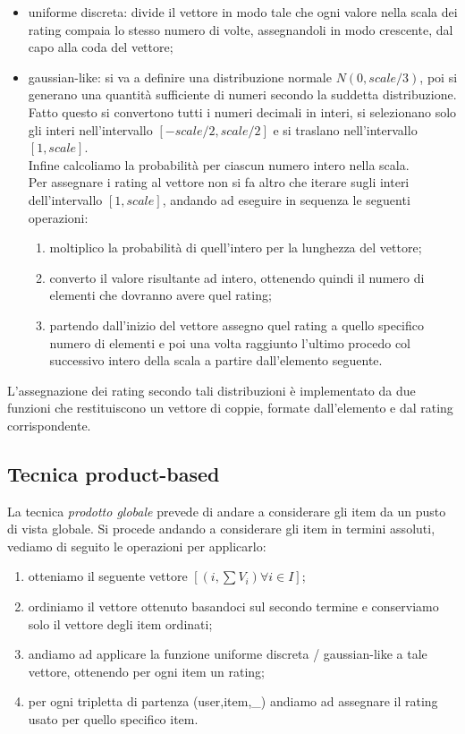 \begin{itemize}
    \item uniforme discreta: divide il vettore in modo tale che ogni valore nella scala dei rating compaia lo stesso numero di volte, assegnandoli in modo crescente, dal capo alla coda del vettore;
    \item gaussian-like: si va a definire una distribuzione normale $N(0,scale/3)$, poi si generano una quantità sufficiente di numeri secondo la suddetta distribuzione. Fatto questo si convertono tutti i numeri decimali in interi, si selezionano solo gli interi nell'intervallo $[-scale/2,scale/2]$ e si traslano nell'intervallo $[1,scale]$.\\
    Infine calcoliamo la probabilità per ciascun numero intero nella scala.\\
    Per assegnare i rating al vettore non si fa altro che iterare sugli interi dell'intervallo $[1,scale]$, andando ad eseguire in sequenza le seguenti operazioni:
    \begin{enumerate}
        \item moltiplico la probabilità di quell'intero per la lunghezza del vettore;
        \item converto il valore risultante ad intero, ottenendo quindi il numero di elementi che dovranno avere quel rating;
        \item partendo dall'inizio del vettore assegno quel rating a quello specifico numero di elementi e poi una volta raggiunto l'ultimo procedo col successivo intero della scala a partire dall'elemento seguente.
    \end{enumerate}
\end{itemize}
L'assegnazione dei rating secondo tali distribuzioni è implementato da due funzioni che restituiscono un vettore di coppie, formate dall'elemento e dal rating corrispondente.

\subsection{Tecnica product-based}
La tecnica \textit{prodotto globale} prevede di andare a considerare gli item da un pusto di vista globale. Si procede andando a considerare gli item in termini assoluti, vediamo di seguito le operazioni per applicarlo:
\begin{enumerate}
    \item otteniamo il seguente vettore $[(i,\sum V_i) \forall i \in I]$;
    \item ordiniamo il vettore ottenuto basandoci sul secondo termine e conserviamo solo il vettore degli item ordinati;
    \item andiamo ad applicare la funzione uniforme discreta / gaussian-like a tale vettore, ottenendo per ogni item un rating;
    \item per ogni tripletta di partenza (user,item,\_) andiamo ad assegnare il rating usato per quello specifico item. 
\end{enumerate}

